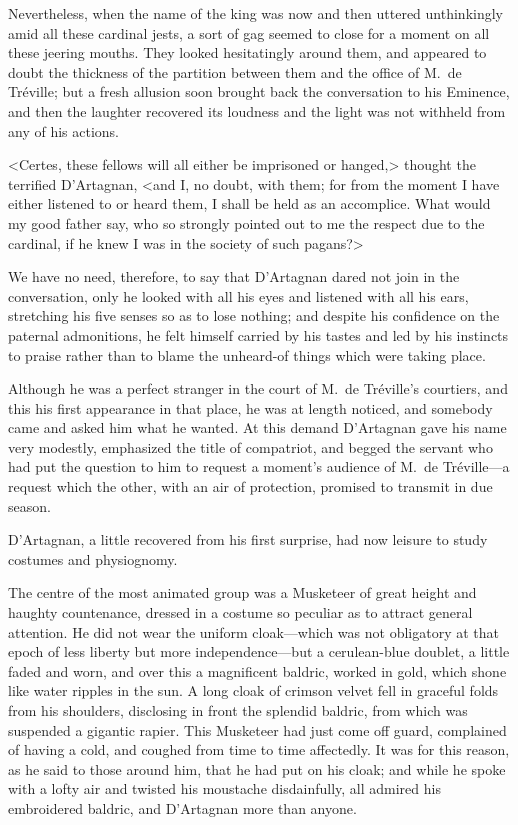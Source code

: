 Nevertheless, when the name of the king was now and then uttered unthinkingly amid all these cardinal jests, a sort of gag seemed to close for a moment on all these jeering mouths. They looked hesitatingly around them, and appeared to doubt the thickness of the partition between them and the office of M.~de Tréville; but a fresh allusion soon brought back the conversation to his Eminence, and then the laughter recovered its loudness and the light was not withheld from any of his actions. 

<Certes, these fellows will all either be imprisoned or hanged,> thought the terrified D'Artagnan, <and I, no doubt, with them; for from the moment I have either listened to or heard them, I shall be held as an accomplice. What would my good father say, who so strongly pointed out to me the respect due to the cardinal, if he knew I was in the society of such pagans?> 

We have no need, therefore, to say that D'Artagnan dared not join in the conversation, only he looked with all his eyes and listened with all his ears, stretching his five senses so as to lose nothing; and despite his confidence on the paternal admonitions, he felt himself carried by his tastes and led by his instincts to praise rather than to blame the unheard-of things which were taking place. 

Although he was a perfect stranger in the court of M.~de Tréville's courtiers, and this his first appearance in that place, he was at length noticed, and somebody came and asked him what he wanted. At this demand D'Artagnan gave his name very modestly, emphasized the title of compatriot, and begged the servant who had put the question to him to request a moment's audience of M.~de Tréville—a request which the other, with an air of protection, promised to transmit in due season. 

D'Artagnan, a little recovered from his first surprise, had now leisure to study costumes and physiognomy. 

The centre of the most animated group was a Musketeer of great height and haughty countenance, dressed in a costume so peculiar as to attract general attention. He did not wear the uniform cloak—which was not obligatory at that epoch of less liberty but more independence—but a cerulean-blue doublet, a little faded and worn, and over this a magnificent baldric, worked in gold, which shone like water ripples in the sun. A long cloak of crimson velvet fell in graceful folds from his shoulders, disclosing in front the splendid baldric, from which was suspended a gigantic rapier. This Musketeer had just come off guard, complained of having a cold, and coughed from time to time affectedly. It was for this reason, as he said to those around him, that he had put on his cloak; and while he spoke with a lofty air and twisted his moustache disdainfully, all admired his embroidered baldric, and D'Artagnan more than anyone. 

